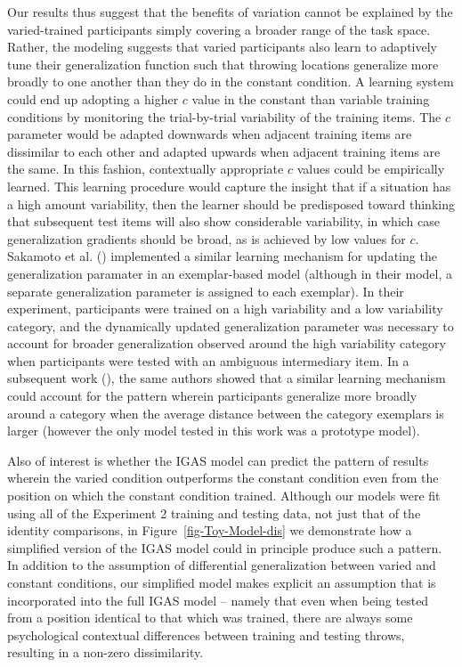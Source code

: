 \documentclass[
  11pt,
  letterpaper,
]{article}
\begin{document}
Our results thus suggest that the benefits of variation cannot be
explained by the varied-trained participants simply covering a broader
range of the task space. Rather, the modeling suggests that varied
participants also learn to adaptively tune their generalization function
such that throwing locations generalize more broadly to one another than
they do in the constant condition. A learning system could end up
adopting a higher \(c\) value in the constant than variable training
conditions by monitoring the trial-by-trial variability of the training
items. The \(c\) parameter would be adapted downwards when adjacent
training items are dissimilar to each other and adapted upwards when
adjacent training items are the same. In this fashion, contextually
appropriate \(c\) values could be empirically learned. This learning
procedure would capture the insight that if a situation has a high
amount variability, then the learner should be predisposed toward
thinking that subsequent test items will also show considerable
variability, in which case generalization gradients should be broad, as
is achieved by low values for \(c\). Sakamoto et al.
()
implemented a similar learning mechanism for updating the generalization
paramater in an exemplar-based model (although in their model, a
separate generalization parameter is assigned to each exemplar). In
their experiment, participants were trained on a high variability and a
low variability category, and the dynamically updated generalization
parameter was necessary to account for broader generalization observed
around the high variability category when participants were tested with
an ambiguous intermediary item. In a subsequent work
(), the same authors showed that a similar learning mechanism could
account for the pattern wherein participants generalize more broadly
around a category when the average distance between the category
exemplars is larger (however the only model tested in this work was a
prototype model).

Also of interest is whether the IGAS model can predict the pattern of
results wherein the varied condition outperforms the constant condition
even from the position on which the constant condition trained. Although
our models were fit using all of the Experiment 2 training and testing
data, not just that of the identity comparisons, in
Figure~\ref{fig-Toy-Model-dis} we demonstrate how a simplified version
of the IGAS model could in principle produce such a pattern. In addition
to the assumption of differential generalization between varied and
constant conditions, our simplified model makes explicit an assumption
that is incorporated into the full IGAS model -- namely that even when
being tested from a position identical to that which was trained, there
are always some psychological contextual differences between training
and testing throws, resulting in a non-zero dissimilarity.
\end{document}
